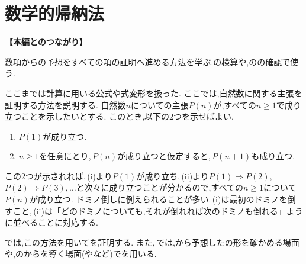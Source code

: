 
  \section{数学的帰納法}\label{節：数学的帰納法}
  \noindent\textbf{【本編とのつながり】}\par
  数項からの予想をすべての項の証明へ進める方法を学ぶ.の検算や,のの確認で使う.

    ここまでは計算に用いる公式や式変形を扱った. ここでは,自然数に関する主張を証明する方法を説明する.
    自然数$n$についての主張$P(n)$が,すべての$n\ge1$で成り立つことを示したいとする.
    このとき,以下の2つを示せばよい.
    \begin{enumerate}[label=(\roman*),parsep=3pt]
      \item $P(1)$が成り立つ.
      \item $n\ge1$を任意にとり,\,$P(n)$が成り立つと仮定すると,\,$P(n+1)$も成り立つ.
    \end{enumerate}
    この2つが示されれば,\,(i)より$P(1)$が成り立ち,\,(ii)より$P(1)\Rightarrow P(2)$,\,$P(2)\Rightarrow P(3)$,\,$\ldots$と次々に成り立つことが分かるので,すべての$n\ge1$について$P(n)$が成り立つ.
    ドミノ倒しに例えられることが多い.\,(i)は最初のドミノを倒すこと,\,(ii)は「どのドミノについても,それが倒れれば次のドミノも倒れる」ように並べることに対応する.

    では,この方法を用いてを証明する.
    また,\,では,から予想したの形を確かめる場面や,のからを導く場面(やなど)でを用いる.
